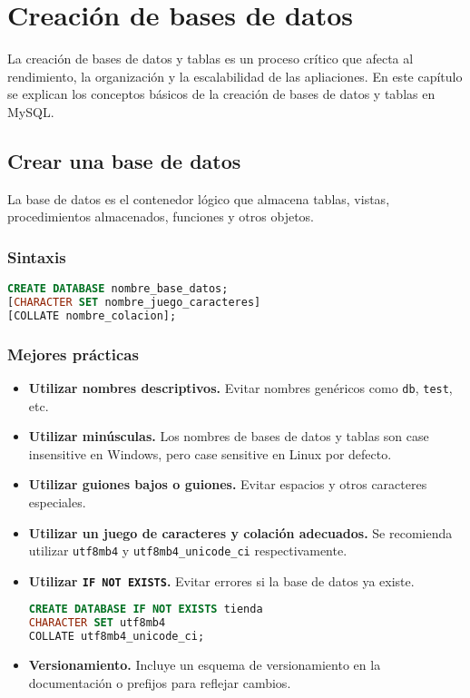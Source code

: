 \chapter{Creación de bases de datos}

La creación de bases de datos y tablas es un proceso
crítico que afecta al rendimiento, la organización y la
escalabilidad de las apliaciones. En este capítulo se
explican los conceptos básicos de la creación de bases
de datos y tablas en MySQL.

\section{Crear una base de datos}

La base de datos es el contenedor lógico que almacena tablas,
vistas, procedimientos almacenados, funciones y otros objetos.

\subsection{Sintaxis}

\begin{lstlisting}[language=SQL]
CREATE DATABASE nombre_base_datos;
[CHARACTER SET nombre_juego_caracteres]
[COLLATE nombre_colacion];
\end{lstlisting}

\vspace{10pt}

\subsection{Mejores prácticas}

\begin{itemize}
    \item \textbf{Utilizar nombres descriptivos.} Evitar nombres genéricos como \texttt{db}, \texttt{test}, etc.
    \item \textbf{Utilizar minúsculas.} Los nombres de bases de datos y tablas son case insensitive en Windows, pero case sensitive en Linux por defecto.
    \item \textbf{Utilizar guiones bajos o guiones.} Evitar espacios y otros caracteres especiales.
    \item \textbf{Utilizar un juego de caracteres y colación adecuados.} Se recomienda utilizar \texttt{utf8mb4} y \texttt{utf8mb4\_unicode\_ci} respectivamente.
    \item \textbf{Utilizar \texttt{IF NOT EXISTS}.} Evitar errores si la base de datos ya existe.
\begin{lstlisting}[language=SQL]
CREATE DATABASE IF NOT EXISTS tienda
CHARACTER SET utf8mb4
COLLATE utf8mb4_unicode_ci;
\end{lstlisting}
    \item \textbf{Versionamiento.} Incluye un esquema de versionamiento en la documentación o prefijos para reflejar cambios.
\end{itemize}

